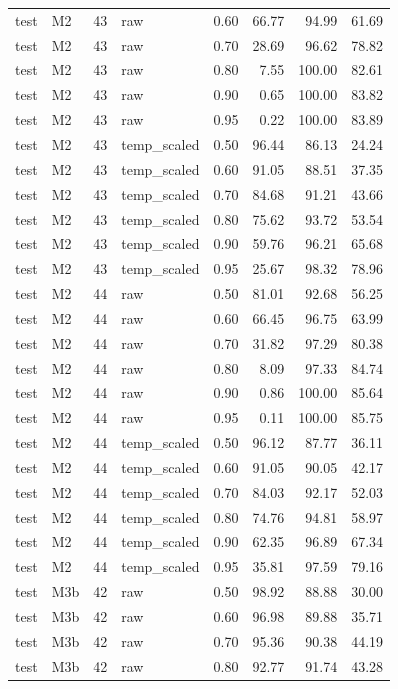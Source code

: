 \begin{tabular}{llrlrrrr}
test & M2 & 43 & raw & 0.60 & 66.77 & 94.99 & 61.69 \\
test & M2 & 43 & raw & 0.70 & 28.69 & 96.62 & 78.82 \\
test & M2 & 43 & raw & 0.80 & 7.55 & 100.00 & 82.61 \\
test & M2 & 43 & raw & 0.90 & 0.65 & 100.00 & 83.82 \\
test & M2 & 43 & raw & 0.95 & 0.22 & 100.00 & 83.89 \\
test & M2 & 43 & temp\_scaled & 0.50 & 96.44 & 86.13 & 24.24 \\
test & M2 & 43 & temp\_scaled & 0.60 & 91.05 & 88.51 & 37.35 \\
test & M2 & 43 & temp\_scaled & 0.70 & 84.68 & 91.21 & 43.66 \\
test & M2 & 43 & temp\_scaled & 0.80 & 75.62 & 93.72 & 53.54 \\
test & M2 & 43 & temp\_scaled & 0.90 & 59.76 & 96.21 & 65.68 \\
test & M2 & 43 & temp\_scaled & 0.95 & 25.67 & 98.32 & 78.96 \\
test & M2 & 44 & raw & 0.50 & 81.01 & 92.68 & 56.25 \\
test & M2 & 44 & raw & 0.60 & 66.45 & 96.75 & 63.99 \\
test & M2 & 44 & raw & 0.70 & 31.82 & 97.29 & 80.38 \\
test & M2 & 44 & raw & 0.80 & 8.09 & 97.33 & 84.74 \\
test & M2 & 44 & raw & 0.90 & 0.86 & 100.00 & 85.64 \\
test & M2 & 44 & raw & 0.95 & 0.11 & 100.00 & 85.75 \\
test & M2 & 44 & temp\_scaled & 0.50 & 96.12 & 87.77 & 36.11 \\
test & M2 & 44 & temp\_scaled & 0.60 & 91.05 & 90.05 & 42.17 \\
test & M2 & 44 & temp\_scaled & 0.70 & 84.03 & 92.17 & 52.03 \\
test & M2 & 44 & temp\_scaled & 0.80 & 74.76 & 94.81 & 58.97 \\
test & M2 & 44 & temp\_scaled & 0.90 & 62.35 & 96.89 & 67.34 \\
test & M2 & 44 & temp\_scaled & 0.95 & 35.81 & 97.59 & 79.16 \\
test & M3b & 42 & raw & 0.50 & 98.92 & 88.88 & 30.00 \\
test & M3b & 42 & raw & 0.60 & 96.98 & 89.88 & 35.71 \\
test & M3b & 42 & raw & 0.70 & 95.36 & 90.38 & 44.19 \\
test & M3b & 42 & raw & 0.80 & 92.77 & 91.74 & 43.28 \\

\end{tabular}
